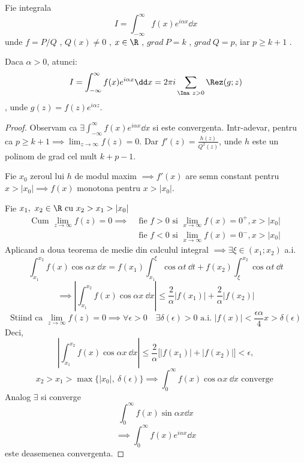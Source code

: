 \begin{tip}
    Fie integrala
    \[
        I = \int_{-\infty}^{\infty} f(x) e^{i \alpha x}\dd x
    \]
    unde $f=P/Q$ , $Q(x)\neq 0$ , $x \in \R$ , $grad\ P = k$ , $grad\ Q =p$,
    iar $p \geq k+1$ .

    Daca $\alpha > 0$, atunci:
    \[
        I = \int_{-\infty}^{\infty} f(x) e^{i \alpha x}\dd x
            =2 \pi i \sum_{\Ima\ z >0} \Rez(g;z)
    \]
    , unde $g(z) = f(z) e^{i \alpha z}$.

    \begin{proof}
        Observam ca
        $\displaystyle
            \exists \int_{-\infty}^{\infty} f(x) e^{i \alpha x}\dd x
        $
        si este convergenta.
        Intr-adevar, pentru ca $\displaystyle p\geq k+1 \implies \lim_{z\to\infty}f(z) = 0$.
        Dar $\displaystyle f'(z) = \frac{h(z)}{Q^2(z)}$, unde $h$ este un polinom
        de grad cel mult $k+p-1$.

        Fie $x_0$ zeroul lui $h$ de modul maxim $\implies f'(x)$
        are semn constant pentru $x>|x_0| \implies f(x) $ monotona pentru $x>|x_0|$.

        Fie $x_1,\ x_2 \in \R \text{ cu } x_2 > x_1 > |x_0|$
        \[
            \begin{aligned}
            \text{Cum } \lim_{z\to\infty} f(z) = 0 \implies
                &\text{ fie } f>0 \text{ si } \lim_{x\to\infty} f(x) = 0^+ , x >|x_0|\\
                &\text{ fie } f<0 \text{ si } \lim_{x\to\infty} f(x) = 0^- , x >|x_0|
            \end{aligned}
        \]
        Aplicand a doua teorema de medie din calculul integral
        $\implies \exists \xi \in (x_1;x_2)$ a.i.
        \[
            \int_{x_1}^{x_2} f(x) \cos \alpha x\ \dd x
                = f(x_1) \int_{x_1}^{\xi} \cos \alpha t\ \dd t
                + f(x_2) \int_{\xi}^{x_2} \cos \alpha t\ \dd t
        \]
        \[
            \implies \left | \int_{x_1}^{x_2} f(x) \cos \alpha x\ \dd x  \right |
                \leq \frac{2}{\alpha} |f(x_1)| + \frac{2}{\alpha} |f(x_2)|
        \]
        \[
            \text{Stiind ca } \lim_{z\to\infty} f(z) = 0 \implies
                \forall \epsilon > 0 \quad \exists \delta(\epsilon) > 0 \text{ a.i. } |f(x)|<\frac{\epsilon \alpha }{4}
            x > \delta(\epsilon)
        \]
        Deci,
        \[
            \left | \int_{x_1}^{x_2} f(x) \cos \alpha x\ \dd x  \right |
                \leq \frac{2}{\alpha} \big[ |f(x_1)|+ |f(x_2)| \big] < \epsilon ,
        \]
        \[
            x_2 > x_1 > \max\{|x_0|,\ \delta(\epsilon)\}
                \implies \int_{0}^{\infty} f(x)\cos \alpha x\ \dd x
                \text{ converge }
        \]
        Analog $\exists$ si converge
        \[
            \int_{0}^{\infty} f(x)\sin \alpha x \dd x
        \]
        \[
            \implies \int_{0}^{\infty} f(x) e^{i \alpha x} \dd x
        \]
        este deasemenea convergenta.


\end{proof}
\end{tip}
